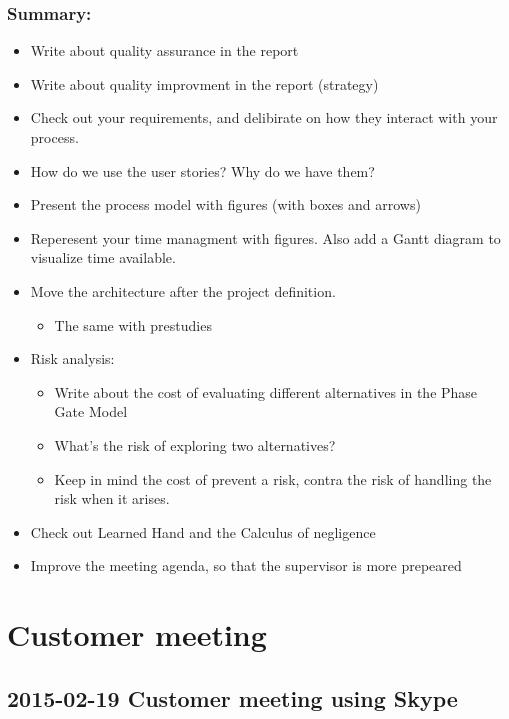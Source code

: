 \subsubsection*{Summary:}
\begin{itemize}
\setlength{\itemsep}{0cm}%
\item Write about quality assurance in the report
\item Write about quality improvment in the report (strategy)
\item Check out your requirements, and delibirate on how they interact with your process.
\item How do we use the user stories? Why do we have them?
\item Present the process model with figures (with boxes and arrows)
\item Reperesent your time managment with figures. Also add a Gantt diagram to visualize time available. 
\item Move the architecture after the project definition. \begin{itemize}
\setlength{\itemsep}{0cm}%
\item The same with prestudies 
\end{itemize}
\item Risk analysis: \begin{itemize}
\setlength{\itemsep}{0cm}%
\item Write about the cost of evaluating different alternatives in the Phase Gate Model
\item What’s the risk of exploring two alternatives?
\item Keep in mind the cost of prevent a risk, contra the risk of handling the risk when it arises. 
\end{itemize}
\item Check out Learned Hand and the Calculus of negligence
\item Improve the meeting agenda, so that the supervisor is more prepeared 
\end{itemize}

\section{Customer meeting}

\subsection*{2015-02-19 Customer meeting using Skype}


